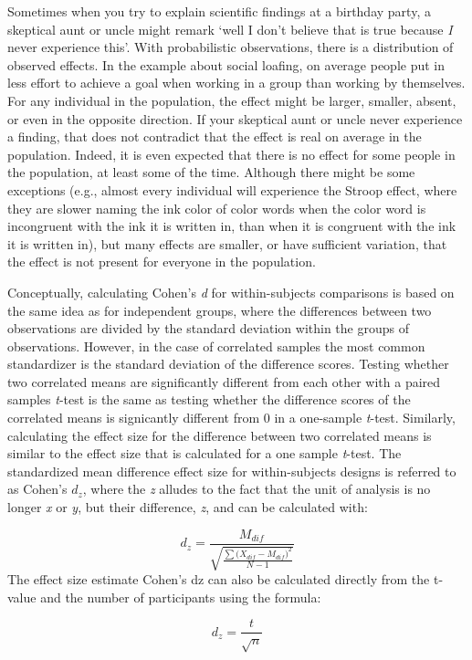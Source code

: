 \documentclass[
]{krantz}
\begin{document}
Sometimes when you try to explain scientific findings at a birthday party, a skeptical aunt or uncle might remark `well I don't believe that is true because \emph{I} never experience this'. With probabilistic observations, there is a distribution of observed effects. In the example about social loafing, on average people put in less effort to achieve a goal when working in a group than working by themselves. For any individual in the population, the effect might be larger, smaller, absent, or even in the opposite direction. If your skeptical aunt or uncle never experience a finding, that does not contradict that the effect is real on average in the population. Indeed, it is even expected that there is no effect for some people in the population, at least some of the time. Although there might be some exceptions (e.g., almost every individual will experience the Stroop effect, where they are slower naming the ink color of color words when the color word is incongruent with the ink it is written in, than when it is congruent with the ink it is written in), but many effects are smaller, or have sufficient variation, that the effect is not present for everyone in the population.

Conceptually, calculating Cohen's \emph{d} for within-subjects comparisons is based on the same idea as for independent groups, where the differences between two observations are divided by the standard deviation within the groups of observations. However, in the case of correlated samples the most common standardizer is the standard deviation of the difference scores. Testing whether two correlated means are significantly different from each other with a paired samples \emph{t}-test is the same as testing whether the difference scores of the correlated means is signicantly different from 0 in a one-sample \emph{t}-test. Similarly, calculating the effect size for the difference between two correlated means is similar to the effect size that is calculated for a one sample \emph{t}-test. The standardized mean difference effect size for within-subjects designs is referred to as Cohen's \(d_z\), where the \emph{z} alludes to the fact that the unit of analysis is no longer \emph{x} or \emph{y}, but their difference, \emph{z}, and can be calculated with:

\[d_z = \frac{M_{dif}}{\sqrt{\frac{\sum{({X_{dif}-M_{dif})}}^2}{N-1}}}\]
The effect size estimate Cohen's dz can also be calculated directly from the t-value and the number of participants using the formula:

\[d_z = \frac{t}{\sqrt{n}}\]
\end{document}
